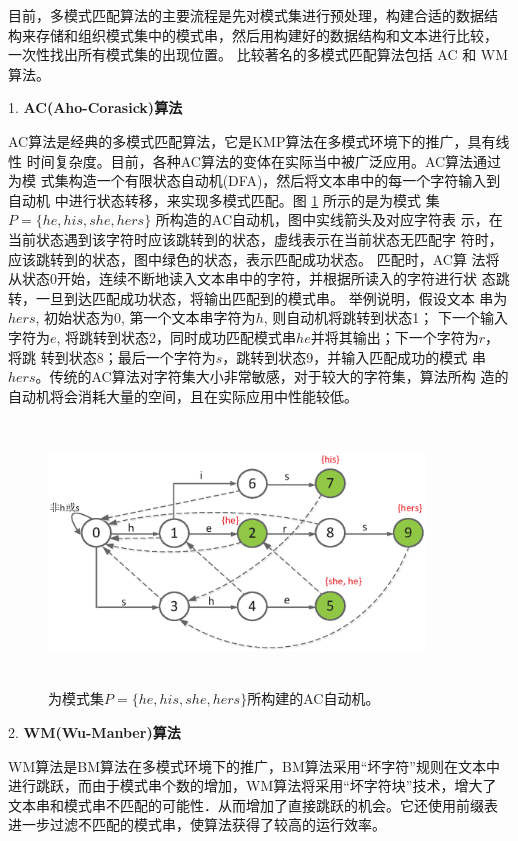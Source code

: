 目前，多模式匹配算法的主要流程是先对模式集进行预处理，构建合适的数据结
构来存储和组织模式集中的模式串，然后用构建好的数据结构和文本进行比较，
一次性找出所有模式集的出现位置。 比较著名的多模式匹配算法包括 AC
\cite{Aho1975} 和 WM \cite{Wu1994} 算法。

1. \textbf{AC(Aho-Corasick)算法}

AC算法是经典的多模式匹配算法，它是KMP算法在多模式环境下的推广，具有线性
时间复杂度。目前，各种AC算法的变体在实际当中被广泛应用。AC算法通过为模
式集构造一个有限状态自动机(DFA)，然后将文本串中的每一个字符输入到自动机
中进行状态转移，来实现多模式匹配。图 \ref{fig:AC} 所示的是为模式
集$P=\{he, his, she, hers\}$ 所构造的AC自动机，图中实线箭头及对应字符表
示，在当前状态遇到该字符时应该跳转到的状态，虚线表示在当前状态无匹配字
符时，应该跳转到的状态，图中绿色的状态，表示匹配成功状态。 匹配时，AC算
法将从状态0开始，连续不断地读入文本串中的字符，并根据所读入的字符进行状
态跳转，一旦到达匹配成功状态，将输出匹配到的模式串。 举例说明，假设文本
串为$hers$, 初始状态为0, 第一个文本串字符为$h$, 则自动机将跳转到状态1；
下一个输入字符为$e$,
将跳转到状态2，同时成功匹配模式串$he$并将其输出；下一个字符为$r$，将跳
转到状态8；最后一个字符为$s$，跳转到状态9，并输入匹配成功的模式
串$hers$。传统的AC算法对字符集大小非常敏感，对于较大的字符集，算法所构
造的自动机将会消耗大量的空间，且在实际应用中性能较低。


\begin{figure}[!h]
  \centering
  \includegraphics[height=7cm ,width=10cm]{figures/1_Introduction/AC.eps}
  \caption{为模式集$P=\{he, his, she, hers\}$所构建的AC自动机。}
  \label{fig:AC}
\end{figure}

2. \textbf{WM(Wu-Manber)算法}

 WM算法是BM算法在多模式环境下的推广，BM算法采用“坏字符”规则在文本中
进行跳跃，而由于模式串个数的增加，WM算法将采用“坏字符块”技术，增大了
文本串和模式串不匹配的可能性．从而增加了直接跳跃的机会。它还使用前缀表
进一步过滤不匹配的模式串，使算法获得了较高的运行效率。

